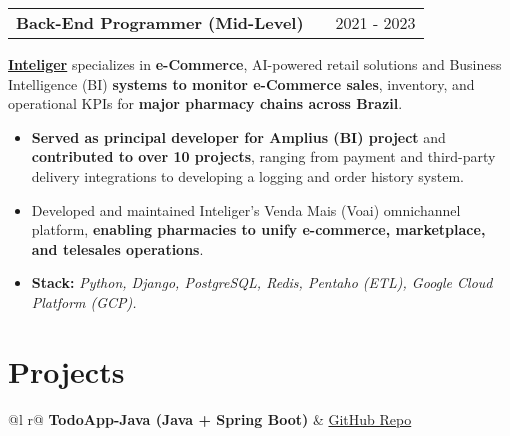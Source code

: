 \documentclass[a4paper,12pt]{article}
\makeatletter
\newenvironment{joblong}[2]
{
    \begin{tabularx}{\linewidth}{@{}l X r@{}}
        \textbf{#1} & \hfill & #2 \\[3.75pt]
    \end{tabularx}
    \begin{minipage}[t]{\linewidth}
    }
    {
    \end{minipage}
}
\newenvironment{bullets}
{
    \begin{itemize}[nosep,after=\strut, leftmargin=1em, itemsep=3pt,label=--]
    }
    {
    \end{itemize}
}
\makeatother
\begin{document}
    \begin{joblong}{Back-End Programmer (Mid-Level)}{2021 - 2023}
        \href{https://inteliger.com.br}{\textbf{Inteliger}} specializes in \textbf{e-Commerce}, AI-powered retail solutions and Business Intelligence (BI) \textbf{systems to monitor e-Commerce sales}, inventory, and operational KPIs for \textbf{major pharmacy chains across Brazil}.
        \begin{bullets}
            \item \textbf{Served as principal developer for Amplius (BI) project} and \textbf{contributed to over 10 projects}, ranging from payment and third-party delivery integrations to developing a logging and order history system.
            \item Developed and maintained Inteliger’s Venda Mais (Voai) omnichannel platform, \textbf{enabling pharmacies to unify e-commerce, marketplace, and telesales operations}.
            \item \textbf{Stack:} \textit{Python, Django, PostgreSQL, Redis, Pentaho (ETL), Google Cloud Platform (GCP).}
        \end{bullets}
    \end{joblong}



    \section{Projects}
    \begin{tabularx}{\linewidth}{ @{}l r@{} }
        \textbf{TodoApp-Java (Java + Spring Boot)} & \hfill \href{https://github.com/JoaoVLima/TodoApp-Java}{GitHub Repo} \\[3.75pt]
        \\
    \end{tabularx}
\end{document}
